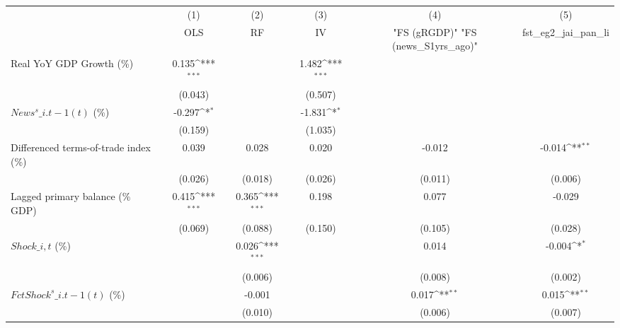 {
\def\sym#1{\ifmmode^{#1}\else\(^{#1}\)\fi}
\begin{tabular}{l*{5}{c}}
\toprule
                    &\multicolumn{1}{c}{(1)}&\multicolumn{1}{c}{(2)}&\multicolumn{1}{c}{(3)}&\multicolumn{1}{c}{(4)}&\multicolumn{1}{c}{(5)}\\
                    &\multicolumn{1}{c}{OLS}&\multicolumn{1}{c}{RF}&\multicolumn{1}{c}{IV}&\multicolumn{1}{c}{ "FS (gRGDP)"  "FS (news\_S1yrs\_ago)" }&\multicolumn{1}{c}{fst\_eg2\_jai\_pan\_li}\\
\midrule
Real YoY GDP Growth (\%)&       0.135\sym{***}&                     &       1.482\sym{***}&                     &                     \\
                    &     (0.043)         &                     &     (0.507)         &                     &                     \\
\addlinespace
$ News^s\_{i.t-1}(t)$ (\%)&      -0.297\sym{*}  &                     &      -1.831\sym{*}  &                     &                     \\
                    &     (0.159)         &                     &     (1.035)         &                     &                     \\
\addlinespace
Differenced terms-of-trade index (\%)&       0.039         &       0.028         &       0.020         &      -0.012         &      -0.014\sym{**} \\
                    &     (0.026)         &     (0.018)         &     (0.026)         &     (0.011)         &     (0.006)         \\
\addlinespace
Lagged primary balance (\% GDP)&       0.415\sym{***}&       0.365\sym{***}&       0.198         &       0.077         &      -0.029         \\
                    &     (0.069)         &     (0.088)         &     (0.150)         &     (0.105)         &     (0.028)         \\
\addlinespace
$ Shock\_{i,t}$ (\%) &                     &       0.026\sym{***}&                     &       0.014         &      -0.004\sym{*}  \\
                    &                     &     (0.006)         &                     &     (0.008)         &     (0.002)         \\
\addlinespace
$ FctShock^s\_{i.t-1}(t)$ (\%)&                     &      -0.001         &                     &       0.017\sym{**} &       0.015\sym{**} \\
                    &                     &     (0.010)         &                     &     (0.006)         &     (0.007)         \\

\end{tabular}}
